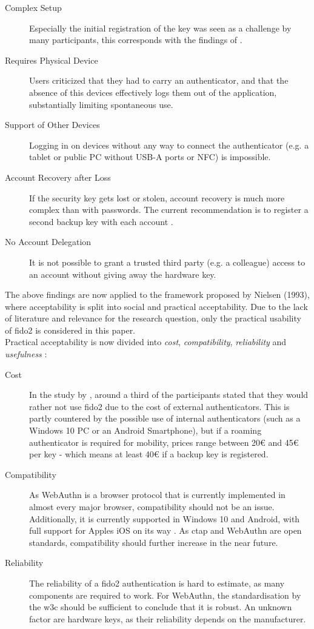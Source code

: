 \begin{description}
    \item[Complex Setup] Especially the initial registration of the key was seen as a challenge by many participants, this corresponds with the findings of \cite{das2018}.
    \item[Requires Physical Device] Users criticized that they had to carry an authenticator, and that the absence of this devices effectively logs them out of the application, substantially limiting spontaneous use.
    \item[Support of Other Devices] Logging in on devices without any way to connect the authenticator (e.g. a tablet or public PC without USB-A ports or NFC) is impossible.
    \item[Account Recovery after Loss] If the security key gets lost or stolen, account recovery is much more complex than with passwords. The current recommendation is to register a second backup key with each account \cite{gomi2019}.
    \item[No Account Delegation] It is not possible to grant a trusted third party (e.g. a colleague) access to an account without giving away the hardware key.
\end{description}

The above findings are now applied to the framework proposed by Nielsen (1993), where acceptability is split into social and practical acceptability. Due to the lack of literature and relevance for the research question, only the practical usability of \ac{fido2} is considered in this paper.\\
Practical acceptability is now divided into \emph{cost}, \emph{compatibility}, \emph{reliability} and \emph{usefulness} \cite[25 \psq]{nielsen1993}:

\begin{description}
    \item[Cost] In the study by \cite{lyastani2020}, around a third of the participants stated that they would rather not use \ac{fido2} due to the cost of external authenticators. This is partly countered by the possible use of internal authenticators (such as a Windows 10 PC or an Android Smartphone), but if a roaming authenticator is required for mobility, prices range between 20€ and 45€ per key \cite{yubikey_5_nfc} - which means at least 40€ if a backup key is registered.
    \item[Compatibility] As WebAuthn is a browser protocol that is currently implemented in almost every major browser, compatibility should not be an issue. Additionally, it is currently supported in Windows 10 and Android, with full support for Apples iOS on its way \cite{nichols2020}. As \ac{ctap} and WebAuthn are open standards, compatibility should further increase in the near future.
    \item[Reliability] The reliability of a \ac{fido2} authentication is hard to estimate, as many components are required to work. For WebAuthn, the standardisation by the \ac{w3c} should be sufficient to conclude that it is robust. An unknown factor are hardware keys, as their reliability depends on the manufacturer.
\end{description}

